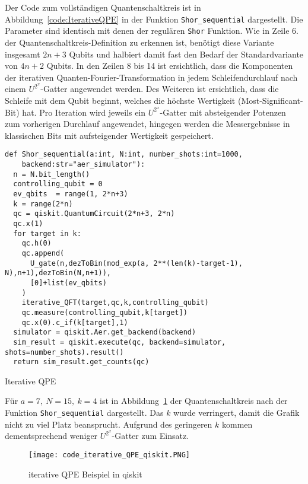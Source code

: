 Der Code zum vollständigen Quantenschaltkreis ist in Abbildung~\ref{code:IterativeQPE} in der Funktion \texttt{Shor_sequential} dargestellt.
Die Parameter sind identisch mit denen der regulären \texttt{Shor} Funktion. 
Wie in Zeile 6. der Quantenschaltkreis-Definition zu erkennen ist, 
benötigt diese Variante insgesamt \(2n+3\) Qubits und halbiert damit fast den Bedarf der Standardvariante von \(4n+2\) Qubits.
In den Zeilen 8 bis 14 ist ersichtlich, 
dass die Komponenten der iterativen Quanten-Fourier-Transformation in jedem Schleifendurchlauf nach einem \(U^{2^x}\)-Gatter angewendet werden. 
Des Weiteren ist ersichtlich, 
dass die Schleife mit dem Qubit beginnt, 
welches die höchste Wertigkeit (Most-Significant-Bit) hat.
Pro Iteration wird jeweils ein \(U^{2^x}\)-Gatter mit absteigender Potenzen zum vorherigen Durchlauf angewendet, 
hingegen werden die Messergebnisse in klassischen Bits mit aufsteigender Wertigkeit gespeichert.

\begin{listing}[H]
\begin{verbatim}    
def Shor_sequential(a:int, N:int, number_shots:int=1000,
    backend:str="aer_simulator"):
  n = N.bit_length()
  controlling_qubit = 0
  ev_qbits  = range(1, 2*n+3)
  k = range(2*n)
  qc = qiskit.QuantumCircuit(2*n+3, 2*n) 
  qc.x(1)
  for target in k:
    qc.h(0)
    qc.append(
      U_gate(n,dezToBin(mod_exp(a, 2**(len(k)-target-1), N),n+1),dezToBin(N,n+1)),
      [0]+list(ev_qbits)
    )
    iterative_QFT(target,qc,k,controlling_qubit)
    qc.measure(controlling_qubit,k[target])
    qc.x(0).c_if(k[target],1)
  simulator = qiskit.Aer.get_backend(backend)
  sim_result = qiskit.execute(qc, backend=simulator, shots=number_shots).result()
  return sim_result.get_counts(qc)
  \end{verbatim}
  \caption{Iterative QPE}
  \label{code:IterativeQPE}
\end{listing}

Für \(a = 7,~N=15,~k=4\) ist in Abbildung~\ref{fig:iterative_iQPE_qiskit} der Quantenschaltkreis nach der Funktion \texttt{Shor_sequential} dargestellt.
Das \(k\) wurde verringert, damit die Grafik nicht zu viel Platz beansprucht.
Aufgrund des geringeren \(k\) kommen dementsprechend weniger \(U^{2^x}\)-Gatter zum Einsatz.

\begin{figure} [H]
  \centering
  \texttt{[image: code\_iterative\_QPE\_qiskit.PNG]}
  \caption{iterative QPE Beispiel in qiskit}
  \label{fig:iterative_iQPE_qiskit}
\end{figure}

